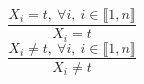 $$\frac{X_{i}=t,~\forall i,~i \in \llbracket1,n\rrbracket}{X_{i}=t}$$ $$\frac{X_{i} \neq t,~\forall i,~i \in \llbracket1,n\rrbracket}{X_{i} \neq t}$$ 